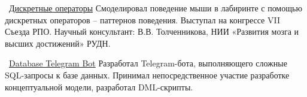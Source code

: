 \documentclass[11pt]{spidercv}
\begin{document}
\begin{MainPart}

    \Experience
        {\ColorHighlight}
		{\Large\faGithub\ \href{https://github.com/necroshine0/maze-proj}{Дискретные операторы}}
            {}{}
        {   
            Смоделировал поведение мыши в лабиринте с помощью дискретных операторов -- паттернов поведения. Выступал на конгрессе VII Съезда РПО. Научный консультант: В.В. Толченникова, НИИ «Развития мозга и высших достижений» РУДН. \\
        }

    \Experience
        {\ColorHighlight}
		{\Large\faGithub\ \href{https://github.com/necroshine0/database-theory-proj}{Database Telegram Bot}}
            {}{}
        {   
            Разработал Telegram-бота, выполняющего сложные SQL-запросы к базе данных. Принимал непосредственное участие разработке концептуальной модели, разработал DML-скрипты.\\
        }


    \end{MainPart}
\end{document}
